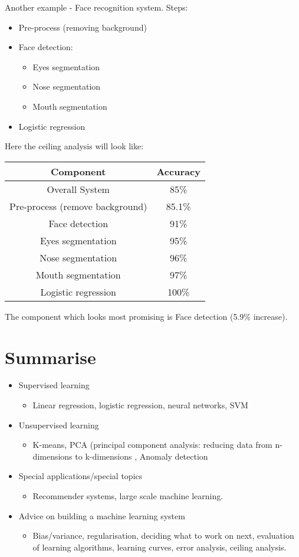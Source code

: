 \documentclass{scrartcl}
\begin{document}
Another example - Face recognition system. Steps:
\begin{itemize}
\item Pre-process (removing background)
\item Face detection:
  \begin{itemize}
  \item Eyes segmentation
  \item Nose segmentation
  \item Mouth segmentation
  \end{itemize}
\item Logistic regression
\end{itemize}

Here the ceiling analysis will look like:
\begin{tabular}{c|c}
  \textbf{Component} & \textbf{Accuracy} \\
  \hline
  Overall System & 85\% \\
  Pre-process (remove background)& 85.1\% \\
  Face detection & 91\% \\
  Eyes segmentation & 95\% \\
  Nose segmentation & 96\% \\
  Mouth segmentation & 97\% \\
  Logistic regression & 100\%
\end{tabular}

The component which looks most promising is Face detection (5.9\%
increase). 

\section{Summarise}
\label{sec:19}

\begin{itemize}
\item Supervised learning
  \begin{itemize}
  \item Linear regression, logistic regression, neural networks, SVM
  \end{itemize}
\item Unsupervised learning 
  \begin{itemize}
  \item K-means, PCA (principal component analysis: reducing data from
    n-dimensions to k-dimensions , Anomaly detection
  \end{itemize}
\item Special applications/special topics
  \begin{itemize}
  \item Recommender systems, large scale machine learning.
  \end{itemize}
\item Advice on building a machine learning system
  \begin{itemize}
  \item Bias/variance, regularisation, deciding what to work on next,
    evaluation of learning algorithms, learning curves, error
    analysis, ceiling analysis.
  \end{itemize}
\end{itemize}
\end{document}
